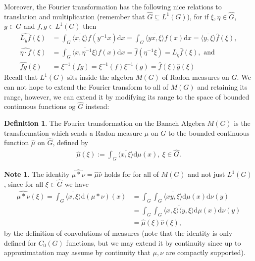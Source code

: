 \documentclass[10pt,twoside,openany,final]{memoir}
\theoremstyle{definition}
\newtheorem{definition}[theorem]{Definition}
\theoremstyle{Break}
\newtheorem*{note}{Note}
\newcommand{\G}{\widehat{G}}
\renewcommand{\d}{\mathrm{d}}
\begin{document}
Moreover, the Fourier transformation has the following nice relations to translation and multiplication (remember that $\G \subseteq L^1(G)$), for if $\xi, \eta \in \G$, $y \in G$ and $f,g \in L^1(G)$ then
\begin{align*}
	\widehat{L_y f}(\xi)&=\int_G \overline{\langle x, \xi \rangle} f(y^{-1}x) \d x = \int_G \overline{\langle yx, \xi \rangle} f(x) \d x=\overline{\langle y, \xi \rangle} \widehat{f}(\xi),\label{4.14}\tag{4.14}
	\\
	\widehat{\eta\cdot f}(\xi) &= \int_G \overline{\langle x, \eta^{-1} \xi\rangle} f(x) \d x = \widehat{f}(\eta^{-1}\xi)=L_\eta \widehat{f}(\xi), \text{ and }\label{4.15}\tag{4.15}\\
	\widehat{fg}(\xi)&=\xi^{-1}(fg)=\xi^{-1}(f)\xi^{-1}(g)=\widehat{f}(\xi)\widehat{g}(\xi)\label{4.16}\tag{4.16}
\end{align*}
Recall that $L^1(G)$ sits inside the algebra $M(G)$ of Radon measures on $G$. We can not hope to extend the Fourier transform to all of $M(G)$ and retaining its range, however, we can extend it by modifying its range to the space of bounded continuous functions og $\G$ instead:
\begin{definition}
	The Fourier transformation on the Banach Algebra $M(G)$ is the transformation which sends a Radon measure $\mu$ on $G$ to the bounded continuous function $\widehat{\mu}$ on $\G$, defined by
	\begin{align*}
		\widehat{\mu}(\xi):=\int_G \overline{\langle x, \xi \rangle} \d \mu(x), \ \xi \in \G.
	\end{align*}
\end{definition}
\begin{note}
	The identity $\widehat{\mu \ast \nu}=\widehat{\mu}\widehat{\nu}$ holds for for all of $M(G)$ and not just $L^1(G)$, since for all $\xi \in \G$ we have
	\begin{align*}
		\widehat{\mu \ast \nu}(\xi) = \int_G \overline{\langle x , \xi \rangle} \d (\mu \ast \nu) (x) &= \int_G \int_G \overline{\langle xy , \xi\rangle} \d \mu(x) \d \nu(y)\\
		&= \int_G \int_G \overline{\langle x,\xi \rangle \langle y, \xi \rangle} \d \mu(x) \d \nu(y) \\
		&= \widehat{\mu}(\xi) \widehat{\nu}(\xi),
	\end{align*}
by the definition of convolutions of measures (note that the identity is only defined for $C_0(G)$ functions, but we may extend it by continuity since up to approximatation may assume by continuity that $\mu,\nu$ are compactly supported).
\end{note}
\end{document}
